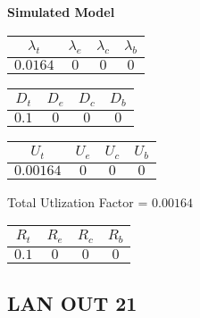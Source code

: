 \documentclass{article}
\begin{document}
\begin{minipage}{0.5\textwidth}
\centering	\textbf{Simulated Model}
\begin{table}[H]
\centering
\begin{tabular}{@{}cccc@{}}
\toprule
$\lambda_t$ & $\lambda_e$ & $\lambda_c$ & $\lambda_b$\\
\midrule
$0.0164$ & $0$ & $0$ & $0$\\
\bottomrule
\end{tabular}
\end{table}
\begin{table}[H]
\centering
\begin{tabular}{@{}cccc@{}}
\toprule
$D_t$ & $D_e$ & $D_c$ & $D_b$\\
\midrule
$0.1$ & $0$ & $0$ & $0$\\
\bottomrule
\end{tabular}
\end{table}\begin{table}[H]
\centering
\begin{tabular}{@{}cccc@{}}
\toprule
$U_t$ & $U_e$ & $U_c$ & $U_b$\\
\midrule
$0.00164$ & $0$ & $0$ & $0$\\
\bottomrule
\end{tabular}
\end{table}
\centering Total Utlization Factor = $0.00164$
\begin{table}[H]
\centering
\begin{tabular}{@{}cccc@{}}
\toprule
$R_t$ & $R_e$ & $R_c$ & $R_b$\\
\midrule
$0.1$ & $0$ & $0$ & $0$\\
\bottomrule
\end{tabular}
\end{table}
\end{minipage}\subsection{LAN OUT 21}
\end{document}
